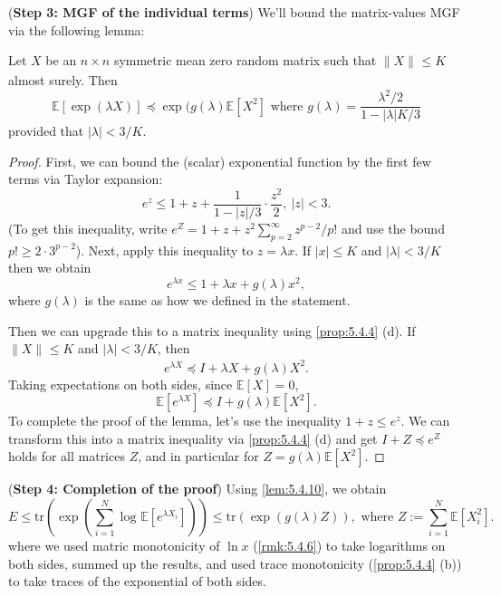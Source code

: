 (\textbf{Step 3: MGF of the individual terms}) We'll bound the matrix-values MGF via the following lemma:
\begin{lemma}
\label{lem:5.4.10}
Let $X$ be an $n \times n$ symmetric mean zero random matrix such that $\lVert X \rVert_{} \leq K$ almost 
surely. Then 
\[ \mathbb{E}[\exp{(\lambda X)}] \preceq \exp{(g(\lambda)\mathbb{E}[X^2]} 
\text{ where } g(\lambda) = \frac{\lambda^2 / 2}{1 - |\lambda|K / 3} \]
provided that $|\lambda| < 3 / K$.
\end{lemma}

\begin{proof}
First, we can bound the (scalar) exponential function by the first few terms via Taylor expansion:
\[ e^z \leq 1 + z + \frac{1}{1 - |z| / 3} \cdot \frac{z^2}{2}, \ |z| < 3. \]
(To get this inequality, write $e^Z = 1 + z + z^2 \sum_{p = 2}^{\infty} z^{p - 2} / p!$ and use the bound 
$p! \geq 2 \cdot 3^{p - 2}$). Next, apply this inequality to $z = \lambda x$. If $|x| \leq K$ and 
$|\lambda| < 3/K$ then we obtain 
\[ e^{\lambda x} \leq 1 + \lambda x + g(\lambda)x^2, \]
where $g(\lambda)$ is the same as how we defined in the statement.

Then we can upgrade this to a matrix inequality using \cref{prop:5.4.4} (d). If $\lVert X \rVert_{} \leq K$ and 
$|\lambda| < 3 / K$, then 
\[ e^{\lambda X} \preceq I + \lambda X + g(\lambda) X^2. \]
Taking expectations on both sides, since $\mathbb{E}[X] = 0$, 
\[ \mathbb{E}[e^{\lambda X}] \preceq I + g(\lambda) \mathbb{E}[X^2]. \]
To complete the proof of the lemma, let's use the inequality $1 + z \leq e^z$. We can transform this into a 
matrix inequality via \cref{prop:5.4.4} (d) and get $I + Z \preceq e^Z$ holds for all matrices $Z$, and in 
particular for $Z = g(\lambda)\mathbb{E}[X^2]$.
\end{proof}

(\textbf{Step 4: Completion of the proof}) Using \cref{lem:5.4.10}, we obtain 
\[ E \leq \mathrm{tr}\left( \exp{\left( \sum_{i = 1}^{N} \log_{}{\mathbb{E}[e^{\lambda X_i}]} 
\right)} \right) \leq \mathrm{tr}(\exp{(g(\lambda)Z)}), \text{ where } Z := \sum_{i = 1}^{N} \mathbb{E}[X_i^2]. \]where we used matric monotonicity of $\ln{x}$ (\cref{rmk:5.4.6}) to take logarithms on both sides, summed up 
the results, and used trace monotonicity (\cref{prop:5.4.4} (b)) to take traces of the exponential of both sides.

